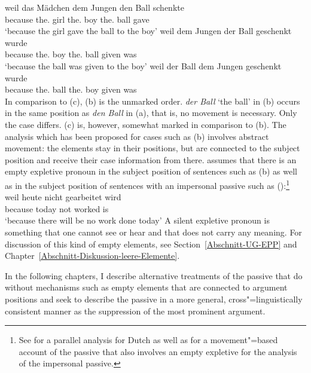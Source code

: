 \eal
\label{ex-passive-German-no-movement}
\ex 
\gll weil das Mädchen dem Jungen den Ball schenkte\\
     because the.\nom{} girl the.\dat{} boy the.\acc{} ball gave\\
\glt `because the girl gave the ball to the boy'
\ex 
\gll weil dem Jungen der Ball geschenkt wurde\\
	 because the.\dat{} boy the.\nom{} ball given was\\
\glt `because the ball was given to the boy'
\ex 
\gll weil der Ball dem Jungen geschenkt wurde\\
     because the.\nom{} ball the.\dat{} boy given was\\
\zl
\addlines[1]
\largerpage
In comparison to (c), (b) is the unmarked order. \emph{der Ball} `the ball' in (b) occurs
in the same position as \emph{den Ball} in (a), that is, no movement is necessary. Only the case differs.
(c) is, however, somewhat marked in comparison to (b). The analysis which has been proposed for
cases such as (b) involves abstract movement: the elements stay in their positions, but are connected to
the subject position and receive their case information from there. \citet[]{Grewendorf93}
assumes that there is an empty expletive pronoun
in the subject position of sentences such as (b) as well as in the subject position of sentences with an
impersonal passive such as ():\footnote{%
	See  for a parallel analysis for Dutch as well as 
	 for a movement"=based account of the passive that also involves an
        empty expletive for the analysis of the impersonal passive.
}
\ea
\gll weil heute nicht gearbeitet wird\\
	 because today not worked is\\
\glt `because there will be no work done today'
\z
A silent expletive pronoun is something that one cannot see or hear and that does not carry any meaning. For discussion of 
this kind of empty elements, see Section~\ref{Abschnitt-UG-EPP} and Chapter~\ref{Abschnitt-Diskussion-leere-Elemente}.

In the following chapters, I describe alternative treatments of the passive that do without mechanisms such as
empty elements that are connected to argument positions and seek to describe the passive in a more
general, cross"=linguistically consistent manner as the suppression of the most prominent argument.

